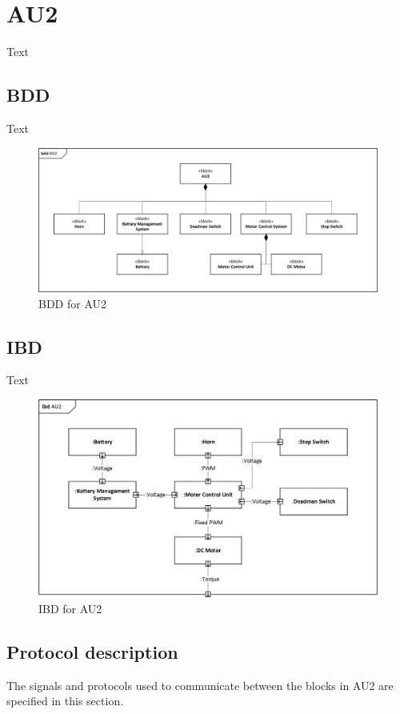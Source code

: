 \section{AU2}
Text

\subsection{BDD}
Text

\begin{figure}[H]
	\centering
	\includegraphics[width=0.9\linewidth]{Architecture/BDD_AU2}
	\caption{ BDD for AU2}
	\label{fig:AU2_BDD}
\end{figure}

\subsection{IBD}
Text

\begin{figure}[H]
	\centering
	\includegraphics[width=0.9\linewidth]{Architecture/IBD_AU2}
	\caption{IBD for AU2}
	\label{fig:AU2_IBD}
\end{figure}

\subsection{Protocol description}
The signals and protocols used to communicate between the blocks in AU2 are specified in this section.

